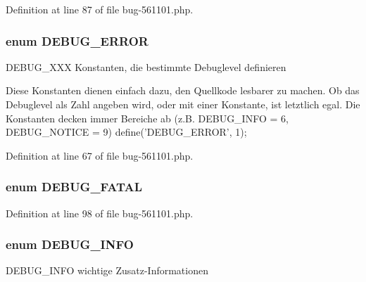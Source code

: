 \-Definition at line 87 of file bug-\/561101.\-php.

\hypertarget{bug-561101_8php_a217a26c8270e25d26f6d60a96bf5abca}{
\subsubsection[{\-D\-E\-B\-U\-G\-\_\-\-E\-R\-R\-O\-R}]{\setlength{\rightskip}{0pt plus 5cm}enum {\bf \-D\-E\-B\-U\-G\-\_\-\-E\-R\-R\-O\-R}}}\label{bug-561101_8php_a217a26c8270e25d26f6d60a96bf5abca}
\-D\-E\-B\-U\-G\-\_\-\-X\-X\-X \-Konstanten, die bestimmte \-Debuglevel definieren

\-Diese \-Konstanten dienen einfach dazu, den \-Quellkode lesbarer zu machen. \-Ob das \-Debuglevel als \-Zahl angeben wird, oder mit einer \-Konstante, ist letztlich egal. \-Die \-Konstanten decken immer \-Bereiche ab (z.\-B. \-D\-E\-B\-U\-G\-\_\-\-I\-N\-F\-O = 6, \-D\-E\-B\-U\-G\-\_\-\-N\-O\-T\-I\-C\-E = 9) define('\-D\-E\-B\-U\-G\-\_\-\-E\-R\-R\-O\-R', 1); 

\-Definition at line 67 of file bug-\/561101.\-php.

\hypertarget{bug-561101_8php_a3066c1031615e2ca1476a0ccf2683122}{
\subsubsection[{\-D\-E\-B\-U\-G\-\_\-\-F\-A\-T\-A\-L}]{\setlength{\rightskip}{0pt plus 5cm}enum {\bf \-D\-E\-B\-U\-G\-\_\-\-F\-A\-T\-A\-L}}}\label{bug-561101_8php_a3066c1031615e2ca1476a0ccf2683122}


\-Definition at line 98 of file bug-\/561101.\-php.

\hypertarget{bug-561101_8php_a7a4be1301dac540c466a395278786877}{
\subsubsection[{\-D\-E\-B\-U\-G\-\_\-\-I\-N\-F\-O}]{\setlength{\rightskip}{0pt plus 5cm}enum {\bf \-D\-E\-B\-U\-G\-\_\-\-I\-N\-F\-O}}}\label{bug-561101_8php_a7a4be1301dac540c466a395278786877}
\-D\-E\-B\-U\-G\-\_\-\-I\-N\-F\-O wichtige \-Zusatz-\/\-Informationen 

